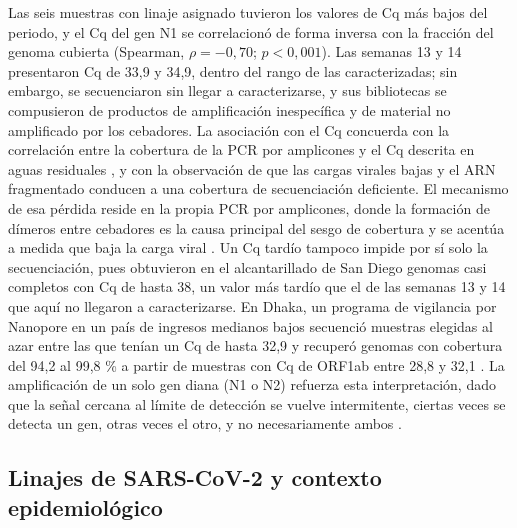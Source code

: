 Las seis muestras con linaje asignado tuvieron los valores de Cq más bajos del periodo, y el Cq del gen N1 se correlacionó de forma inversa con la fracción del genoma cubierta (Spearman, $\rho=-0{,}70$; $p<0{,}001$). Las semanas 13 y 14 presentaron Cq de 33,9 y 34,9, dentro del rango de las caracterizadas; sin embargo, se secuenciaron sin llegar a caracterizarse, y sus bibliotecas se compusieron de productos de amplificación inespecífica y de material no amplificado por los cebadores. La asociación con el Cq concuerda con la correlación entre la cobertura de la PCR por amplicones y el Cq descrita en aguas residuales \cite{Child_2023}, y con la observación de que las cargas virales bajas y el ARN fragmentado conducen a una cobertura de secuenciación deficiente. El mecanismo de esa pérdida reside en la propia PCR por amplicones, donde la formación de dímeros entre cebadores es la causa principal del sesgo de cobertura y se acentúa a medida que baja la carga viral \cite{Itokawa_2020}. Un Cq tardío tampoco impide por sí solo la secuenciación, pues  obtuvieron en el alcantarillado de San Diego genomas casi completos con Cq de hasta 38, un valor más tardío que el de las semanas 13 y 14 que aquí no llegaron a caracterizarse. En Dhaka, un programa de vigilancia por Nanopore en un país de ingresos medianos bajos secuenció muestras elegidas al azar entre las que tenían un Cq de hasta 32,9 y recuperó genomas con cobertura del 94,2 al 99,8 \% a partir de muestras con Cq de ORF1ab entre 28,8 y 32,1 \cite{Haque_2023}. La amplificación de un solo gen diana (N1 o N2) refuerza esta interpretación, dado que la señal cercana al límite de detección se vuelve intermitente, ciertas veces se detecta un gen, otras veces el otro, y no necesariamente ambos \cite{Karthikeyan_2022}.

\subsection{Linajes de SARS-CoV-2 y contexto epidemiológico}

